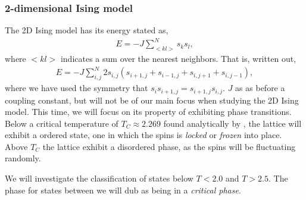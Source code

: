 \subsubsection{2-dimensional Ising model} \label{sec:2d-ising-model}
The 2D Ising model has its energy stated as,
\begin{align}
    E = - J\sum^N_{<kl>} s_k s_l,
    \label{eq:2d-ising-energy}
\end{align}
where $<kl>$ indicates a sum over the nearest neighbors. That is, written out,
\begin{align}
    E = - J\sum^N_{i,j} 2 s_{i,j} (s_{i+1,j} + s_{i-1,j} + s_{i,j+1} + s_{i,j-1}),
    \label{eq:2d-ising-energy-shortened}
\end{align}
where we have used the symmetry that $s_i s_{i+1,j}=s_{i+1,j} s_{i,j}$. $J$ as as before a coupling constant, but will not be of our main focus when studying the 2D Ising model. This time, we will focus on its property of exhibiting phase transitions. Below a critical temperature of $T_C \approx 2.269$ found analytically by \citep{onsager1944crystal}, the lattice will exhibit a ordered state, one in which the spins is \textit{locked} or \textit{frozen} into place. Above $T_C$ the lattice exhibit a disordered phase, as the spins will be fluctuating randomly.

We will investigate the classification of states below $T<2.0$ and $T>2.5$. The phase for states between we will dub as being in a \textit{critical phase}.